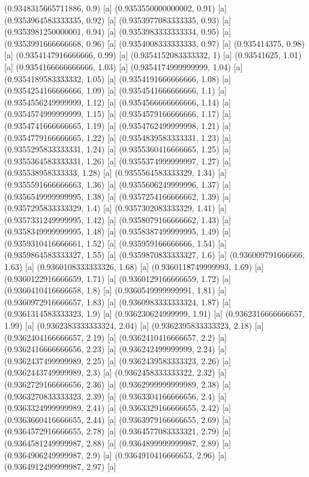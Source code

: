 {{{(0.9348315665711886, 0.9) [a] 
(0.9353550000000002, 0.91) [a] 
(0.9353964583333335, 0.92) [a] 
(0.9353977083333335, 0.93) [a] 
(0.9353981250000001, 0.94) [a] 
(0.9353983333333334, 0.95) [a] 
(0.9353991666666668, 0.96) [a] 
(0.9354008333333333, 0.97) [a] 
(0.935414375, 0.98) [a] 
(0.9354147916666666, 0.99) [a] 
(0.9354152083333332, 1) [a] 
(0.93541625, 1.01) [a] 
(0.9354166666666666, 1.03) [a] 
(0.9354174999999999, 1.04) [a] 
(0.9354189583333332, 1.05) [a] 
(0.9354191666666666, 1.08) [a] 
(0.9354254166666666, 1.09) [a] 
(0.9354541666666666, 1.1) [a] 
(0.9354556249999999, 1.12) [a] 
(0.9354566666666666, 1.14) [a] 
(0.9354574999999999, 1.15) [a] 
(0.9354579166666666, 1.17) [a] 
(0.9354741666666665, 1.19) [a] 
(0.9354762499999998, 1.21) [a] 
(0.9354779166666665, 1.22) [a] 
(0.9354839583333331, 1.23) [a] 
(0.9355295833333331, 1.24) [a] 
(0.9355360416666665, 1.25) [a] 
(0.9355364583333331, 1.26) [a] 
(0.9355374999999997, 1.27) [a] 
(0.935538958333333, 1.28) [a] 
(0.9355564583333329, 1.34) [a] 
(0.9355591666666663, 1.36) [a] 
(0.9355606249999996, 1.37) [a] 
(0.9356549999999995, 1.38) [a] 
(0.9357254166666662, 1.39) [a] 
(0.9357295833333329, 1.4) [a] 
(0.9357302083333329, 1.41) [a] 
(0.9357331249999995, 1.42) [a] 
(0.9358079166666662, 1.43) [a] 
(0.9358349999999995, 1.48) [a] 
(0.9358387499999995, 1.49) [a] 
(0.9359310416666661, 1.52) [a] 
(0.935959166666666, 1.54) [a] 
(0.9359864583333327, 1.55) [a] 
(0.9359870833333327, 1.6) [a] 
(0.936009791666666, 1.63) [a] 
(0.9360108333333326, 1.68) [a] 
(0.9360118749999993, 1.69) [a] 
(0.9360122916666659, 1.71) [a] 
(0.9360129166666659, 1.72) [a] 
(0.9360410416666658, 1.8) [a] 
(0.9360549999999991, 1.81) [a] 
(0.9360972916666657, 1.83) [a] 
(0.9360983333333324, 1.87) [a] 
(0.9361314583333323, 1.9) [a] 
(0.936230624999999, 1.91) [a] 
(0.9362316666666657, 1.99) [a] 
(0.9362383333333324, 2.04) [a] 
(0.9362395833333323, 2.18) [a] 
(0.9362404166666657, 2.19) [a] 
(0.9362410416666657, 2.2) [a] 
(0.9362416666666656, 2.23) [a] 
(0.936242499999999, 2.24) [a] 
(0.9362437499999989, 2.25) [a] 
(0.9362439583333323, 2.26) [a] 
(0.9362443749999989, 2.3) [a] 
(0.9362458333333322, 2.32) [a] 
(0.9362729166666656, 2.36) [a] 
(0.9362999999999989, 2.38) [a] 
(0.9363270833333323, 2.39) [a] 
(0.9363304166666656, 2.4) [a] 
(0.9363324999999989, 2.41) [a] 
(0.9363329166666655, 2.42) [a] 
(0.9363660416666655, 2.44) [a] 
(0.9363979166666655, 2.69) [a] 
(0.9364572916666655, 2.78) [a] 
(0.9364577083333321, 2.79) [a] 
(0.9364581249999987, 2.88) [a] 
(0.9364899999999987, 2.89) [a] 
(0.9364906249999987, 2.9) [a] 
(0.9364910416666653, 2.96) [a] 
(0.9364912499999987, 2.97) [a] 
}}}
